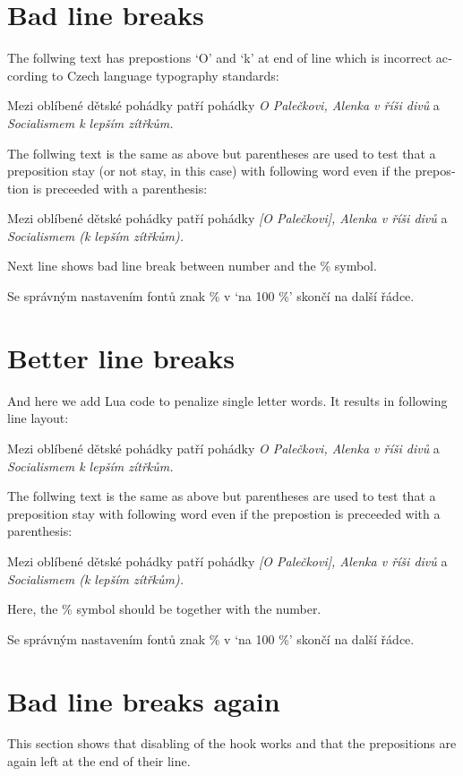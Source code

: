 \documentclass{article}
\newcommand{\expl}[1]{\begin{english}\sffamily #1\end{english}}
\begin{document}
\section{Bad line breaks}
\expl{The follwing text has prepostions `O' and `k' at end of line which
  is incorrect according to Czech language typography standards:}

Mezi oblíbené dětské pohádky patří pohádky \emph{O Palečkovi, Alenka v říši
  divů} a \emph{Socialismem k lepším zítřkům.}

\expl{The follwing text is the same as above but parentheses are used to test
  that a preposition stay (or not stay, in this case) with following word
  even if the prepostion is preceeded with a parenthesis:}

Mezi oblíbené dětské pohádky patří pohádky \emph{[O Palečkovi], Alenka v říši
  divů} a \emph{Socialismem (k lepším zítřkům).}

\expl{Next line shows bad line break between number and the \% symbol.}

Se správným nastavením fontů znak \% v `na 100 \%' skončí na další řádce.

\section{Better line breaks}
\expl{And here we add Lua code to penalize single letter words. It results in
following line layout:}

\cstypoSingleLetterEnable{}
\cstypoPercentsEnable{}
\cstypoALetterEnable{}
Mezi oblíbené dětské pohádky patří pohádky \emph{O Palečkovi, Alenka v říši
  divů} a \emph{Socialismem k lepším zítřkům.}

\expl{The follwing text is the same as above but parentheses are used to test
  that a preposition stay with following word even if the prepostion is
  preceeded with a parenthesis:}

Mezi oblíbené dětské pohádky patří pohádky \emph{[O Palečkovi], Alenka v říši
  divů} a \emph{Socialismem (k lepším zítřkům).}

\expl{Here, the \% symbol should be together with the number.}

Se správným nastavením fontů znak \% v `na 100 \%' skončí na další řádce.

\section{Bad line breaks again}
\expl{This section shows that disabling of the hook works and that the
  prepositions are again left at the end of their line.}
\end{document}
